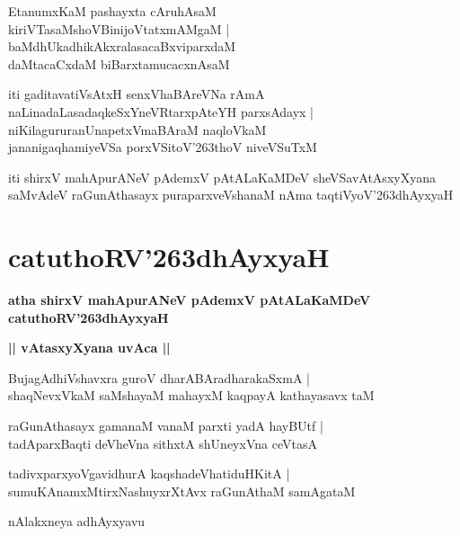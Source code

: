 \documentclass[twoside,12pt,openright]{book}
\def\S{\char'263}
\newcounter{shloka}[chapter]
\def\uvaca#1{\centerline{{\large\textbf{#1}}}}
\begin{document}
\begin{shloka}%
EtanumxKaM pashayxta cAruhAsaM \\
kiriVTasaMshoVBinijoVtatxmAMgaM |\\
baMdhUkadhikAkxralasacaBxviparxdaM \\
daMtacaCxdaM biBarxtamucacxnAsaM 
\end{shloka}

\begin{shloka}%
iti gaditavatiVsAtxH senxVhaBAreVNa rAmA \\
naLinadaLasadaqkeSxYneVRtarxpAteYH parxsAdayx |\\
niKilagururanUnapetxVmaBAraM naqloVkaM \\
jananigaqhamiyeVSa porxVSitoV\S thoV niveVSuTxM 
\end{shloka}

\begin{center}
iti shirxV mahApurANeV pAdemxV pAtALaKaMDeV sheVSavAtAsxyXyana saMvAdeV 
raGunAthasayx puraparxveVshanaM nAma taqtiVyoV\S dhAyxyaH
\end{center}

\chapter{catuthoRV\S dhAyxyaH}

\begin{center}
{\LARGE\bfseries atha shirxV mahApurANeV pAdemxV pAtALaKaMDeV catuthoRV\S dhAyxyaH}
\end{center}

\uvaca{|| vAtasxyXyana uvAca ||}

\begin{shloka}%
BujagAdhiVshavxra guroV dharABAradharakaSxmA |\\
shaqNevxVkaM saMshayaM mahayxM kaqpayA kathayasavx taM 
\end{shloka}

\begin{shloka}%
raGunAthasayx gamanaM vanaM parxti yadA hayBUtf |\\
tadAparxBaqti deVheVna sithxtA shUneyxVna ceVtasA
\end{shloka}

\begin{shloka}%
tadivxparxyoVgavidhurA kaqshadeVhatiduHKitA |\\
sumuKAnamxMtirxNashuyxrXtAvx raGunAthaM samAgataM 
\end{shloka}

\begin{center}
nAlakxneya adhAyxyavu
\end{center}
\end{document}
